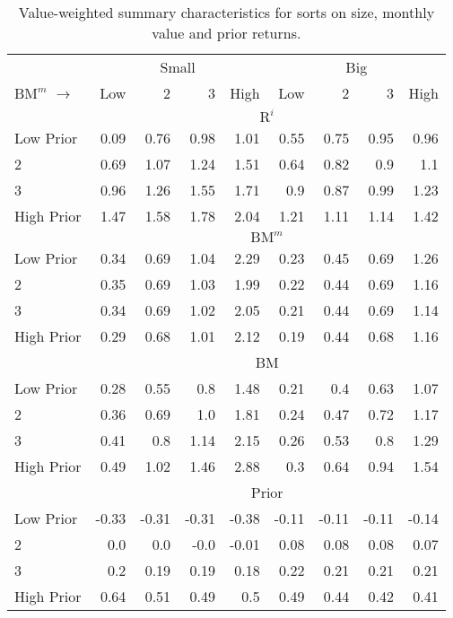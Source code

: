 
\begin{table}[!ht]
\scriptsize
\centering
\caption{
\scriptsize{
Value-weighted summary characteristics for sorts on size, monthly value and
prior returns.
}
}
\begin{tabular}{lrrrrrrrr}
  \toprule
     & \multicolumn{4}{c}{Small} & \multicolumn{4}{c}{Big}  \\
     \cmidrule(r){2-5} \cmidrule(r){6-9}
    $\text{BM}^m$ $\rightarrow$ & Low & 2 & 3 & High & Low & 2 & 3 & High  \\ 
  \midrule
  
  
    & \multicolumn{8}{c}{$\text{R}^i$}  \\
     \cmidrule(r){2-5} \cmidrule(r){6-9}
    Low Prior  & 0.09  & 0.76  & 0.98  & 1.01  & 0.55  & 0.75  & 0.95  & 0.96   \\
    2  & 0.69  & 1.07  & 1.24  & 1.51  & 0.64  & 0.82  & 0.9  & 1.1   \\
    3  & 0.96  & 1.26  & 1.55  & 1.71  & 0.9  & 0.87  & 0.99  & 1.23   \\
    High Prior  & 1.47  & 1.58  & 1.78  & 2.04  & 1.21  & 1.11  & 1.14  & 1.42   \\
    
  
    & \multicolumn{8}{c}{$\text{BM}^m$}  \\
     \cmidrule(r){2-5} \cmidrule(r){6-9}
    Low Prior  & 0.34  & 0.69  & 1.04  & 2.29  & 0.23  & 0.45  & 0.69  & 1.26   \\
    2  & 0.35  & 0.69  & 1.03  & 1.99  & 0.22  & 0.44  & 0.69  & 1.16   \\
    3  & 0.34  & 0.69  & 1.02  & 2.05  & 0.21  & 0.44  & 0.69  & 1.14   \\
    High Prior  & 0.29  & 0.68  & 1.01  & 2.12  & 0.19  & 0.44  & 0.68  & 1.16   \\
    
  
    & \multicolumn{8}{c}{BM}  \\
     \cmidrule(r){2-5} \cmidrule(r){6-9}
    Low Prior  & 0.28  & 0.55  & 0.8  & 1.48  & 0.21  & 0.4  & 0.63  & 1.07   \\
    2  & 0.36  & 0.69  & 1.0  & 1.81  & 0.24  & 0.47  & 0.72  & 1.17   \\
    3  & 0.41  & 0.8  & 1.14  & 2.15  & 0.26  & 0.53  & 0.8  & 1.29   \\
    High Prior  & 0.49  & 1.02  & 1.46  & 2.88  & 0.3  & 0.64  & 0.94  & 1.54   \\
    
  
    & \multicolumn{8}{c}{Prior}  \\
     \cmidrule(r){2-5} \cmidrule(r){6-9}
    Low Prior  & -0.33  & -0.31  & -0.31  & -0.38  & -0.11  & -0.11  & -0.11  & -0.14   \\
    2  & 0.0  & 0.0  & -0.0  & -0.01  & 0.08  & 0.08  & 0.08  & 0.07   \\
    3  & 0.2  & 0.19  & 0.19  & 0.18  & 0.22  & 0.21  & 0.21  & 0.21   \\
    High Prior  & 0.64  & 0.51  & 0.49  & 0.5  & 0.49  & 0.44  & 0.42  & 0.41   \\
    

\end{tabular}
\end{table}
